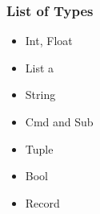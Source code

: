 \begin{frame}
\frametitle{List of Types}
\begin{itemize}
    \item Int, Float
    \item List a
    \item String
    \item Cmd and Sub
    \item Tuple
    \item Bool
    \item Record
\end{itemize}
\end{frame}